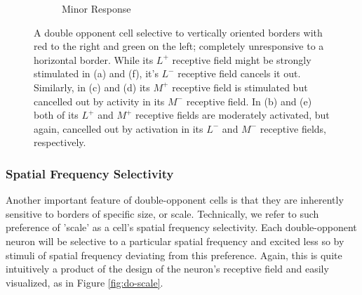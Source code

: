 \documentclass[journal,onecolumn]{IEEEtran}
\begin{document}
\begin{figure}[H]
\begin{subfigure}{0.2\textwidth}
        \caption{Minor Response}
    \end{subfigure}
    \caption{A double opponent cell selective to vertically oriented borders with red to the right and green on the left; completely unresponsive to a horizontal border. While its $L^+$ receptive field might be strongly stimulated in (a) and (f), it's $L^-$ receptive field cancels it out. Similarly, in (c) and (d) its $M^+$ receptive field is stimulated but cancelled out by activity in its $M^-$ receptive field. In (b) and (e) both of its $L^+$ and $M^+$ receptive fields are moderately activated, but again, cancelled out by activation in its $L^-$ and $M^-$ receptive fields, respectively.}
\end{figure}


\subsubsection*{Spatial Frequency Selectivity}

Another important feature of double-opponent cells is that they are inherently sensitive to borders of specific size, or scale. Technically, we refer to such preference of 'scale' as a cell's spatial frequency selectivity. Each double-opponent neuron will be selective to a particular spatial frequency and excited less so by stimuli of spatial frequency deviating from this preference. Again, this is quite intuitively a product of the design of the neuron's receptive field and easily visualized, as in Figure \ref{fig:do-scale}.
\end{document}
